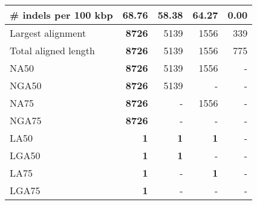 \documentclass[12pt,a4paper]{article}
\begin{document}
\begin{table}[ht]
\begin{center}
\begin{tabular}{|l*{4}{|r}|}
\# indels per 100 kbp & 68.76 & 58.38 & 64.27 & {\bf 0.00} \\ \hline
Largest alignment & {\bf 8726} & 5139 & 1556 & 339 \\ \hline
Total aligned length & {\bf 8726} & 5139 & 1556 & 775 \\ \hline
NA50 & {\bf 8726} & 5139 & 1556 & - \\ \hline
NGA50 & {\bf 8726} & 5139 & - & - \\ \hline
NA75 & {\bf 8726} & - & 1556 & - \\ \hline
NGA75 & {\bf 8726} & - & - & - \\ \hline
LA50 & {\bf 1} & {\bf 1} & {\bf 1} & - \\ \hline
LGA50 & {\bf 1} & {\bf 1} & - & - \\ \hline
LA75 & {\bf 1} & - & {\bf 1} & - \\ \hline
LGA75 & {\bf 1} & - & - & - \\ \hline
\end{tabular}
\end{center}
\end{table}
\end{document}
